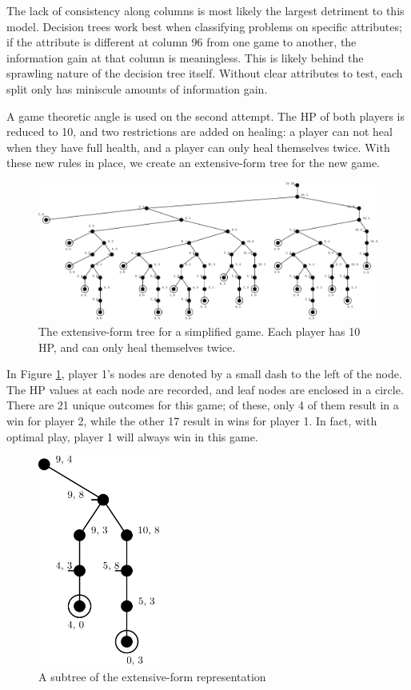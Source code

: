 The lack of consistency along columns is most likely the largest detriment to this model. Decision trees work best when classifying problems on specific attributes; if the attribute is different at column 96 from one game to another, the information gain at that column is meaningless. This is likely behind the sprawling nature of the decision tree itself. Without clear attributes to test, each split only has miniscule amounts of information gain.

A game theoretic angle is used on the second attempt. The HP of both players is reduced to 10, and two restrictions are added on healing: a player can not heal when they have full health, and a player can only heal themselves twice. With these new rules in place, we create an extensive-form tree for the new game.\\

\begin{figure}[H]
  \centering
  \includegraphics[width=15cm]{figures/GameTree.png}
  \caption{The extensive-form tree for a simplified game. Each player has 10 HP, and can only heal themselves twice.}
  \label{fig:gameTree}
\end{figure}

In Figure \ref{fig:gameTree}, player 1's nodes are denoted by a small dash to the left of the node. The HP values at each node are recorded, and leaf nodes are enclosed in a circle. There are 21 unique outcomes for this game; of these, only 4 of them result in a win for player 2, while the other 17 result in wins for player 1. In fact, with optimal play, player 1 will always win in this game.\\

\begin{figure}[H]
  \centering
  \includegraphics[width=4cm]{figures/GameSubtree.png}
  \caption{A subtree of the extensive-form representation}
  \label{fig:gameSubtree}
\end{figure}

